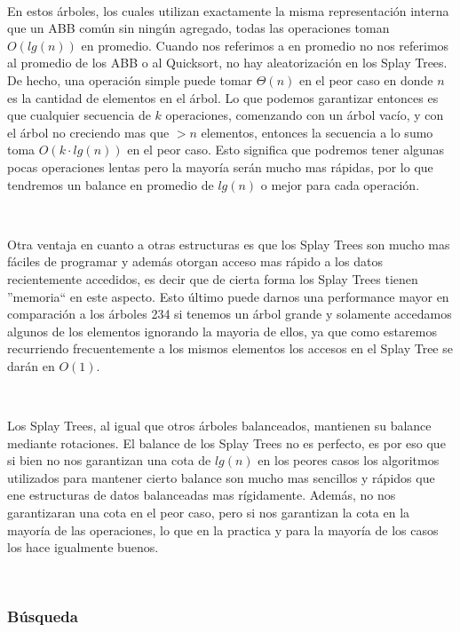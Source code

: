 ~

En estos \'arboles, los cuales utilizan exactamente la misma representaci\'on interna que un ABB com\'un sin ning\'un agregado, todas las operaciones toman $O(lg(n))$ en promedio. Cuando nos referimos a en promedio no nos referimos al promedio de los ABB o al Quicksort, no hay aleatorizaci\'on en los Splay Trees. De hecho, una operaci\'on simple puede tomar $\Theta(n)$ en el peor caso en donde $n$ es la cantidad de elementos en el \'arbol. Lo que podemos garantizar entonces es que cualquier secuencia de $k$ operaciones, comenzando con un \'arbol vac\'io, y con el \'arbol no creciendo mas que $>n$ elementos, entonces la secuencia a lo sumo toma $O(k\cdot lg(n))$ en el peor caso. Esto significa que podremos tener algunas pocas operaciones lentas pero la mayor\'ia ser\'an mucho mas r\'apidas, por lo que tendremos un balance en promedio de $lg(n)$ o mejor para cada operaci\'on.

~

Otra ventaja en cuanto a otras estructuras es que los Splay Trees son mucho mas f\'aciles de programar y adem\'as otorgan acceso mas r\'apido a los datos recientemente accedidos, es decir que de cierta forma los Splay Trees tienen ''memoria`` en este aspecto. Esto \'ultimo puede darnos una performance mayor en comparaci\'on a los \'arboles 234 si tenemos un \'arbol grande y solamente accedamos algunos de los elementos ignorando la mayoria de ellos, ya que como estaremos recurriendo frecuentemente a los mismos elementos los accesos en el Splay Tree se dar\'an en $O(1)$.

~

Los Splay Trees, al igual que otros \'arboles balanceados, mantienen su balance mediante rotaciones. El balance de los Splay Trees no es perfecto, es por eso que si bien no nos garantizan una cota de $lg(n)$ en los peores casos los algoritmos utilizados para mantener cierto balance son mucho mas sencillos y r\'apidos que ene estructuras de datos balanceadas mas r\'igidamente. Adem\'as, no nos garantizaran una cota en el peor caso, pero si nos garantizan la cota en la mayor\'ia de las operaciones, lo que en la practica y para la mayor\'ia de los casos los hace igualmente buenos.

~

\subsubsection{B\'usqueda}

